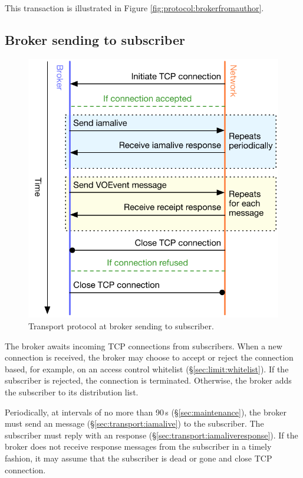 \documentclass[a4paper,11pt]{ivoa}
\begin{document}
This transaction is illustrated in Figure \ref{fig:protocol:brokerfromauthor}.

\subsection{Broker sending to subscriber}
\label{sec:protocol:brokertosub}

\begin{figure}
  \begin{center}
  \includegraphics{figures/brokertosub.pdf}
  \end{center}

  \caption{Transport protocol at broker sending to subscriber.}

  \label{fig:protocol:brokertosub}
\end{figure}

The broker awaits incoming TCP connections from subscribers. When a new
connection is received, the broker may choose to accept or reject the
connection based, for example, on an access control whitelist
(\S\ref{sec:limit:whitelist}). If the subscriber is rejected, the connection
is terminated. Otherwise, the broker adds the subscriber to its distribution
list.

Periodically, at intervals of no more than 90\,s (\S\ref{sec:maintenance}),
the broker must send an  message
(\S\ref{sec:transport:iamalive}) to the subscriber. The subscriber must reply
with an  response (\S\ref{sec:transport:iamaliveresponse}).
If the broker does not receive  response messages from the
subscriber in a timely fashion, it may assume that the subscriber is dead or
gone and close TCP connection.
\end{document}
